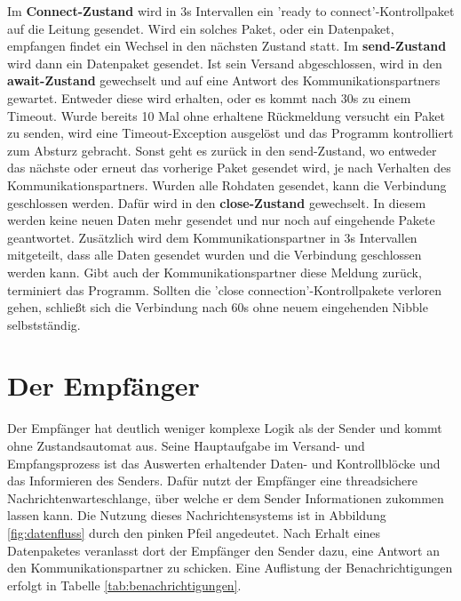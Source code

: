 \noindent
Im \textbf{Connect-Zustand} wird in 3s Intervallen ein 'ready to connect'-Kontrollpaket auf die Leitung gesendet. Wird ein solches Paket, oder ein Datenpaket, empfangen findet ein Wechsel in den nächsten Zustand statt.
Im \textbf{send-Zustand} wird dann ein Datenpaket gesendet. Ist sein Versand abgeschlossen, wird in den \textbf{await-Zustand} gewechselt und auf eine Antwort des Kommunikationspartners gewartet. Entweder diese wird erhalten, oder es kommt nach 30s zu einem Timeout. Wurde bereits 10 Mal ohne erhaltene Rückmeldung versucht ein Paket zu senden, wird eine Timeout-Exception ausgelöst und das Programm kontrolliert zum Absturz gebracht. Sonst geht es zurück in den send-Zustand, wo entweder das nächste oder erneut das vorherige Paket gesendet wird, je nach Verhalten des Kommunikationspartners. Wurden alle Rohdaten gesendet, kann die Verbindung geschlossen werden. Dafür wird in den \textbf{close-Zustand} gewechselt. In diesem werden keine neuen Daten mehr gesendet und nur noch auf eingehende Pakete geantwortet. Zusätzlich wird dem Kommunikationspartner in 3s Intervallen mitgeteilt, dass alle Daten gesendet wurden und die Verbindung geschlossen werden kann. Gibt auch der Kommunikationspartner diese Meldung zurück, terminiert das Programm. Sollten die 'close connection'-Kontrollpakete verloren gehen, schließt sich die Verbindung nach 60s ohne neuem eingehenden Nibble selbstständig.


\section{Der Empfänger}
Der Empfänger hat deutlich weniger komplexe Logik als der Sender und kommt ohne Zustandsautomat aus. Seine Hauptaufgabe im Versand- und Empfangsprozess ist das Auswerten erhaltender Daten- und Kontrollblöcke und das Informieren des Senders. Dafür nutzt der Empfänger eine threadsichere Nachrichtenwarteschlange, über welche er dem Sender Informationen zukommen lassen kann. Die Nutzung dieses Nachrichtensystems ist in Abbildung \ref{fig:datenfluss} durch den pinken Pfeil angedeutet. Nach Erhalt eines Datenpaketes veranlasst dort der Empfänger den Sender dazu, eine Antwort an den Kommunikationspartner zu schicken. Eine Auflistung der Benachrichtigungen erfolgt in Tabelle \ref{tab:benachrichtigungen}.

